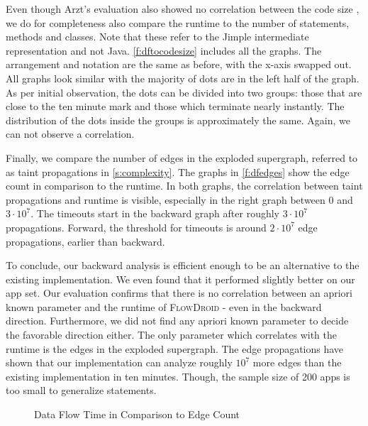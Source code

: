 \documentclass[../draft.tex]{subfiles}
\begin{document}
    Even though Arzt's evaluation also showed no correlation between the code size \cite{Arzt2017PhD}, we do for completeness also compare the runtime to the number of statements, methods and classes. 
    Note that these refer to the Jimple intermediate representation and not Java. 
    \autoref{f:dftocodesize} includes all the graphs. 
    The arrangement and notation are the same as before, with the x-axis swapped out. 
    All graphs look similar with the majority of dots are in the left half of the graph.
    As per initial observation, the dots can be divided into two groups:
    those that are close to the ten minute mark and those which terminate nearly instantly. 
    The distribution of the dots inside the groups is approximately the same.
    Again, we can not observe a correlation.

    Finally, we compare the number of edges in the exploded supergraph, referred to as taint propagations in \autoref{s:complexity}. 
    The graphs in \autoref{f:dfedges} show the edge count in comparison to the runtime. 
    In both graphs, the correlation between taint propagations and runtime is visible, especially in the right graph between $0$ and $3 \cdot 10^7$. 
    The timeouts start in the backward graph after roughly $3 \cdot 10^7$ propagations.
    Forward, the threshold for timeouts is around $2 \cdot 10^7$ edge propagations, earlier than backward.

    To conclude, our backward analysis is efficient enough to be an alternative to the existing implementation. 
    We even found that it performed slightly better on our app set. 
    Our evaluation confirms that there is no correlation between an apriori known parameter and the runtime of \textsc{FlowDroid} - even in the backward direction. 
    Furthermore, we did not find any apriori known parameter to decide the favorable direction either. 
    The only parameter which correlates with the runtime is the edges in the exploded supergraph. 
    The edge propagations have shown that our implementation can analyze roughly $10^7$ more edges than the existing implementation in ten minutes. Though, the sample size of 200 apps is too small to generalize statements.

    \begin{figure}[ht]
        \begin{subfigure}[b]{\textwidth}
            \centering
            \begin{subfigure}[]{0.45\textwidth}
                \centering
                \resizebox{\columnwidth}{!}{
                    
                }
            \end{subfigure}
            \qquad
            \begin{subfigure}[]{0.45\textwidth}
                \centering
                \resizebox{\columnwidth}{!}{
                    
                }
            \end{subfigure}
        \end{subfigure}
        \caption{Data Flow Time in Comparison to Edge Count}
        \label{f:dfedges}
    \end{figure}
\end{document}
